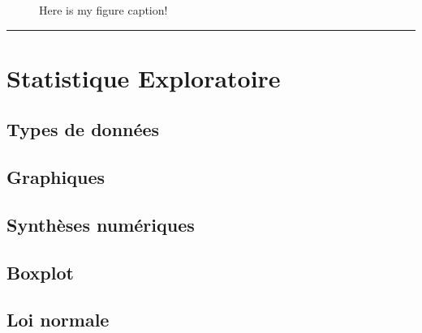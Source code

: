 \documentclass[letterpaper,10pt,english]{jupyterBook}
\let\sphinxpxdimen\pdfpxdimen\else\newdimen\sphinxpxdimen
\begin{document}
\begin{figure}[htbp]
\centering
\capstart

\noindent\sphinxincludegraphics[height=350\sphinxpxdimen]{{table}.pdf}
\caption{Here is my figure caption!}\label{\detokenize{Introduction:directive-fi}}\end{figure}


\bigskip\hrule\bigskip


\sphinxstepscope


\part{Statistique Exploratoire}

\sphinxstepscope


\chapter{Types de données}
\label{\detokenize{Statistiques_exploratoire/types_de_donn_xe9es:types-de-donnees}}\label{\detokenize{Statistiques_exploratoire/types_de_donn_xe9es::doc}}
\sphinxstepscope


\chapter{Graphiques}
\label{\detokenize{Statistiques_exploratoire/graphiques:graphiques}}\label{\detokenize{Statistiques_exploratoire/graphiques::doc}}
\sphinxstepscope


\chapter{Synthèses numériques}
\label{\detokenize{Statistiques_exploratoire/synth_xe8ses_num_xe9riques:syntheses-numeriques}}\label{\detokenize{Statistiques_exploratoire/synth_xe8ses_num_xe9riques::doc}}
\sphinxstepscope


\chapter{Boxplot}
\label{\detokenize{Statistiques_exploratoire/boxplot:boxplot}}\label{\detokenize{Statistiques_exploratoire/boxplot::doc}}
\sphinxstepscope


\chapter{Loi normale}
\label{\detokenize{Statistiques_exploratoire/loi_normale:loi-normale}}\label{\detokenize{Statistiques_exploratoire/loi_normale::doc}}
\sphinxstepscope
\end{document}
